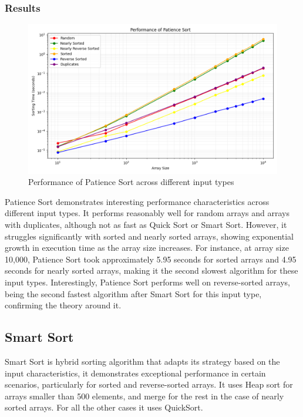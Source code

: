 \documentclass[a4paper,12pt]{article}
\begin{document}
\subsubsection{Results}
\label{sec:orgbab5c7a}
\begin{figure}[htbp]
\centering
\includegraphics[width=.9\linewidth]{sorting_performance_patience_sort.png}
\caption{\label{fig:org3f773f3}Performance of Patience Sort across different input types}
\end{figure}

Patience Sort demonstrates interesting performance characteristics across different input types. It performs reasonably well for random arrays and arrays with duplicates, although not as fast as Quick Sort or Smart Sort. However, it struggles significantly with sorted and nearly sorted arrays, showing exponential growth in execution time as the array size increases. For instance, at array size 10,000, Patience Sort took approximately 5.95 seconds for sorted arrays and 4.95 seconds for nearly sorted arrays, making it the second slowest algorithm for these input types. Interestingly, Patience Sort performs well on reverse-sorted arrays, being the second fastest algorithm after Smart Sort for this input type, confirming the theory around it.
\subsection{Smart Sort}
\label{sec:orgfe2e1a1}
Smart Sort is hybrid sorting algorithm that adapts its strategy based on the input characteristics, it demonstrates exceptional performance in certain scenarios, particularly for sorted and reverse-sorted arrays.
It uses Heap sort for arrays smaller than 500 elements, and merge for the rest in the case of nearly sorted arrays. For all the other cases it uses QuickSort.
\end{document}
